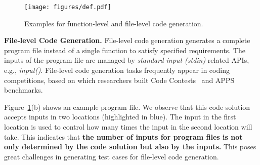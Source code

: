 \begin{figure}[t]
    \centering
    \texttt{[image: figures/def.pdf]}
    \caption{Examples for function-level and file-level code generation.}
    \label{fig:probdef}
\end{figure}


\textbf{File-level Code Generation.} File-level code generation generates a complete program file instead of a single function to satisfy specified requirements. 
The inputs of the program file are managed by \textit{standard input (stdin)} related APIs, e.g., \textit{input()}.
File-level code generation tasks frequently appear in coding competitions, based on which researchers built Code Contests~\cite{codecontests} and APPS~\cite{apps} benchmarks.


Figure~\ref{fig:probdef}(b) shows an example program file.
We observe that this code solution accepts inputs in two locations (highlighted in blue). The input in the first location is used to control how many times the input in the second location will take.
This indicates that \textbf{the number of inputs for program files is not only determined by the code solution but also by the inputs.}
This poses great challenges in generating test cases for file-level code generation.



 



